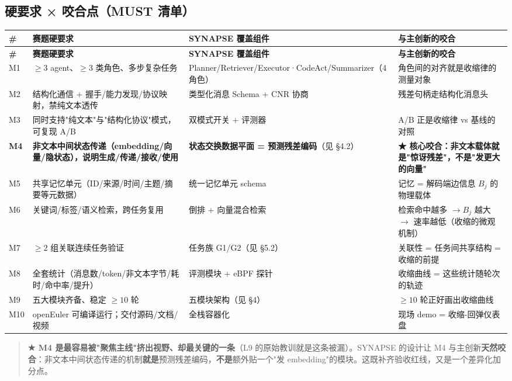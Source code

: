 \documentclass[UTF8,fontset=windows,11pt]{ctexart}
\begin{document}
\subsection{硬要求 × 咬合点（MUST 清单）}
{\footnotesize
\renewcommand{\arraystretch}{1.22}
\begin{longtable}{@{}p{0.7cm}p{4.4cm}p{4.0cm}p{6.0cm}@{}}
\toprule
\textbf{\#} & \textbf{赛题硬要求} & \textbf{SYNAPSE 覆盖组件} & \textbf{与主创新的咬合} \\
\midrule
\endfirsthead
\toprule
\textbf{\#} & \textbf{赛题硬要求} & \textbf{SYNAPSE 覆盖组件} & \textbf{与主创新的咬合} \\
\midrule
\endhead
M1 & $\ge 3$ agent、$\ge 3$ 类角色、多步复杂任务 & Planner/Retriever/Executor·CodeAct/Summarizer（4 角色） & 角色间的对齐就是收缩律的测量对象 \\
M2 & 结构化通信 + 握手/能力发现/协议映射，禁纯文本透传 & 类型化消息 Schema + CNR 协商 & 残差句柄走结构化消息头 \\
M3 & 同时支持"纯文本"与"结构化协议"模式，可复现 A/B & 双模式开关 + 评测器 & A/B 正是收缩律 vs 基线的对照 \\
\textbf{M4} & \textbf{非文本中间状态传递（embedding/向量/隐状态），说明生成/传递/接收/使用} & \textbf{状态交换数据平面 = 预测残差编码}（见 §4.2） & \textcolor{AcademicRed}{\textbf{★ 核心咬合：非文本载体就是"惊讶残差"，不是"发更大的向量"}} \\
M5 & 共享记忆单元（ID/来源/时间/主题/摘要等元数据） & 统一记忆单元 schema & 记忆 = 解码端边信息 $B_j$ 的物理载体 \\
M6 & 关键词/标签/语义检索，跨任务复用 & 倒排 + 向量混合检索 & 检索命中越多 $\to B_j$ 越大 $\to$ 速率越低（收缩的微观机制） \\
M7 & $\ge 2$ 组关联连续任务验证 & 任务族 G1/G2（见 §5.2） & 关联性 = 任务间共享结构 = 收缩的前提 \\
M8 & 全套统计（消息数/token/非文本字节/耗时/命中率/提升） & 评测模块 + eBPF 探针 & 收缩曲线 = 这些统计随轮次的轨迹 \\
M9 & 五大模块齐备、稳定 $\ge 10$ 轮 & 五模块架构（见 §4） & $\ge 10$ 轮正好画出收缩曲线 \\
M10 & openEuler 可编译运行；交付源码/文档/视频 & 全栈容器化 & 现场 demo = 收缩-回弹仪表盘 \\
\bottomrule
\end{longtable}}

\begin{quote}\small
\textcolor{AcademicRed}{\textbf{★ M4 是最容易被"聚焦主线"挤出视野、却最关键的一条}}（L9 的原始教训就是这条被漏）。SYNAPSE 的设计让 M4 与主创新\textbf{天然咬合}：非文本中间状态传递的机制\textbf{就是}预测残差编码，\textbf{不是}额外贴一个"发 embedding"的模块。这既补齐验收红线，又是一个差异化加分点。
\end{quote}
\end{document}

